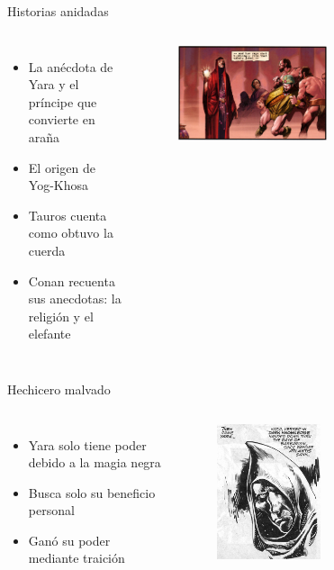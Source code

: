 \begin{frame}{Historias anidadas}
\begin{columns}
 \begin{itemize}
    \item La anécdota de Yara y el príncipe que convierte en araña
    \item El origen de Yog-Khosa
    \item Tauros cuenta como obtuvo la cuerda
    \item Conan recuenta sus anecdotas: la religión y el elefante
 \end{itemize}
    \begin{figure}[htb]
      \centering
      \includegraphics[width=0.6\textwidth]{img/tropes/historias}
    \end{figure}
  \end{columns}
\end{frame}
\note{

}

\begin{frame}{Hechicero malvado}
\begin{columns}
 \begin{itemize}
    \item Yara solo tiene poder debido a la magia negra
    \item Busca solo su beneficio personal
    \item Ganó su poder mediante traición
 \end{itemize}
    \begin{figure}[htb]
      \centering
      \includegraphics[width=0.5\textwidth]{img/tropes/malvado}
    \end{figure}
  \end{columns}
\end{frame}
\note{

}

